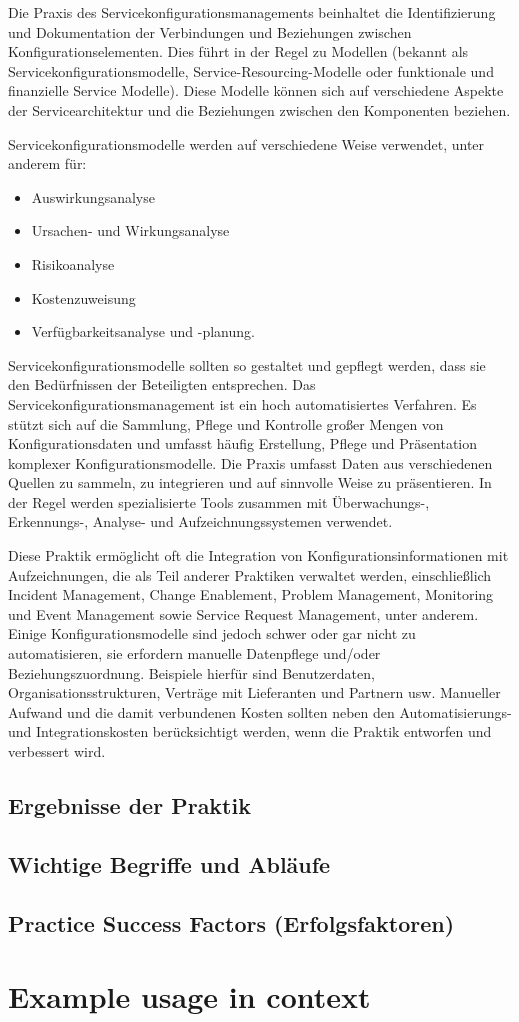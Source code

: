 Die Praxis des Servicekonfigurationsmanagements beinhaltet die Identifizierung
und Dokumentation der Verbindungen und Beziehungen zwischen
Konfigurationselementen. Dies führt in der Regel zu Modellen
(bekannt als Servicekonfigurationsmodelle, Service-Resourcing-Modelle oder
funktionale und finanzielle Service Modelle). Diese Modelle können sich auf
verschiedene Aspekte der Servicearchitektur und die Beziehungen zwischen den
Komponenten beziehen. 

Servicekonfigurationsmodelle werden auf verschiedene Weise verwendet, 
unter anderem für:

\begin{itemize}
    \item Auswirkungsanalyse
    \item Ursachen- und Wirkungsanalyse
    \item Risikoanalyse
    \item Kostenzuweisung
    \item Verfügbarkeitsanalyse und -planung.
\end{itemize}

Servicekonfigurationsmodelle sollten so gestaltet und gepflegt werden, dass sie
den Bedürfnissen der Beteiligten entsprechen. 
Das Servicekonfigurationsmanagement ist ein hoch automatisiertes Verfahren. Es
stützt sich auf die Sammlung, Pflege und Kontrolle großer Mengen von
Konfigurationsdaten und umfasst häufig Erstellung, Pflege und Präsentation
komplexer Konfigurationsmodelle. Die Praxis umfasst Daten aus verschiedenen
Quellen zu sammeln, zu integrieren und auf sinnvolle Weise zu präsentieren.
In der Regel werden spezialisierte Tools zusammen mit Überwachungs-,
Erkennungs-, Analyse- und Aufzeichnungssystemen verwendet.

Diese Praktik ermöglicht oft die Integration von Konfigurationsinformationen
mit Aufzeichnungen, die als Teil anderer Praktiken verwaltet werden, einschließlich Incident Management, Change Enablement, Problem Management, Monitoring und 
Event Management sowie Service Request Management, unter anderem. 
Einige Konfigurationsmodelle sind jedoch
schwer oder gar nicht zu automatisieren, sie erfordern manuelle Datenpflege
und/oder Beziehungszuordnung. Beispiele hierfür sind Benutzerdaten,
Organisationsstrukturen, Verträge mit Lieferanten und Partnern usw. Manueller
Aufwand und die damit verbundenen Kosten sollten neben den
Automatisierungs- und Integrationskosten berücksichtigt werden, wenn die
Praktik entworfen und verbessert wird.

\subsection{Ergebnisse der Praktik}
\subsection{Wichtige Begriffe und Abläufe}
\subsection{Practice Success Factors (Erfolgsfaktoren)}

\section{Example usage in context}
